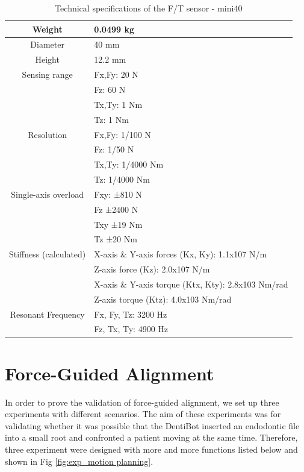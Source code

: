 \begin{table}[htbp]
\centering
\tabcolsep=10pt
\arrayrulewidth=1pt
\caption{Technical specifications of the F/T sensor - mini40}
\label{tab:mini40_specification}
\par
\begin{tabular}{|>{\columncolor{lightgray!20}}c|l|} 
\hline
Weight										&0.0499 kg	\\  \hline
Diameter									&40 mm  	\\ 	\hline
Height										&12.2 mm 	\\	\hline
\multirow{4}{*}{}Sensing range					&Fx,Fy: 20 N\\
											&Fz: 60 N\\
											&Tx,Ty: 1 Nm\\	
											&Tz: 1 Nm\\	\hline
\multirow{4}{*}{}Resolution						&Fx,Fy: 1/100 N	\\
											&Fz: 1/50 N\\
											&Tx,Ty: 1/4000 Nm\\	
											&Tz: 1/4000 Nm\\	\hline										
\multirow{4}{*}{}Single-axis overload 			&Fxy: ±810 N  \\	
											&Fz	±2400 N  \\
											&Txy	±19 Nm  \\
											&Tz	±20 Nm  \\ \hline
\multirow{4}{*}{}Stiffness (calculated)   		&X-axis \& Y-axis forces (Kx, Ky): 1.1x107 N/m   \\	
											&Z-axis force (Kz): 2.0x107 N/m   \\	
											&X-axis \& Y-axis torque (Ktx, Kty): 2.8x103 Nm/rad   \\	
											&Z-axis torque (Ktz): 4.0x103 Nm/rad   \\	 \hline
\multirow{2}{*}{}Resonant Frequency 			&Fx, Fy, Tz: 3200 Hz  \\
											&Fz, Tx, Ty: 4900 Hz  \\
\hline
\end{tabular}
\end{table}

\newpage
\section{Force-Guided Alignment}
\hspace*{6mm}In order to prove the validation of force-guided alignment, we set up three experiments with different scenarios. The aim of these experiments was for validating whether it was possible that the DentiBot inserted an endodontic file into a small root and confronted a patient moving at the same time. Therefore, three experiment were designed with more and more functions listed below and shown in Fig \ref{fig:exp_motion planning}.

